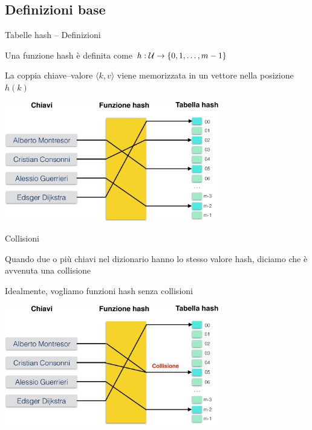 \subsection{Definizioni base}

\begin{frame}{Tabelle hash -- Definizioni}

\vspace{-6pt}
\BI
\item Una \alert{funzione hash} è definita come
\(
h: {\cal U} \rightarrow \{ 0, 1, \ldots, m-1 \}
\)
\item La coppia chiave--valore $\langle k,v \rangle$ viene memorizzata in un vettore nella posizione $h(k)$
\EI	
\begin{center}
\includegraphics[width=0.7\textwidth]{hash-crop.pdf}
\end{center}

\end{frame}

\begin{frame}{Collisioni}

\vspace{-6pt}
\BI
\item Quando due o più chiavi nel dizionario hanno lo stesso valore hash, 
diciamo che è avvenuta una \alert{collisione}
\item Idealmente, vogliamo funzioni hash senza collisioni
\EI
\begin{center}
\includegraphics[width=0.7\textwidth]{collisioni-crop.pdf}
\end{center}

\end{frame}

